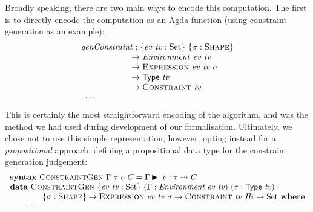 \documentclass[a4paper]{jfp}
\begin{document}
Broadly speaking, there are two main ways to encode this computation. The first is to directly encode the computation as an Agda function (using
constraint generation as an example):
\begin{displaymath}
   \begin{array}{l}
   \mathit{genConstraint} : \{\mathit{ev}\ \mathit{tv} : \text{Set}\}\ \{\sigma : \textsc{Shape}\} \\ \qquad\qquad\qquad 
                          \rightarrow \mathit{Environment}\ \mathit{ev}\ \mathit{tv} \\ \qquad\qquad\qquad  \rightarrow \textsc{Expression}\
                       \mathit{ev}\ \mathit{tv}\ \sigma  \\ \qquad\qquad\qquad
                          \rightarrow \textsf{Type}\ \mathit{tv} \\ \qquad\qquad\qquad \rightarrow \textsc{Constraint}\ \mathit{tv} \\
                       \begin{array}{c}
                          \cdots
                          \end{array}
  \end{array}
\end{displaymath}   
This is certainly the most straightforward encoding of the algorithm, and was the method we had used during development of our formalisation.
Ultimately, we chose not to use this simple representation, however, opting instead for a \emph{propositional} approach, defining a propositional data
type for the constraint generation judgement:
\begin{displaymath}
   \begin{array}{l}
    \textbf{syntax}\ \textsc{ConstraintGen}\ \Gamma\ \tau\ e\ C = \Gamma \vdasharrow e : \tau \leadsto C\\
    \textbf{data}\ \textsc{ConstraintGen}\ \{ \mathit{ev}\ \mathit{tv} : \text{Set}\} \ 
                       (\Gamma : \textit{Environment}\ \mathit{ev}\ \mathit{tv})\ (\tau : \textsf{Type}\ \mathit{tv}) : \\ \qquad\qquad \{\sigma : \textsc{Shape}\}
                    \rightarrow 
                    \textsc{Expression}\ \mathit{ev}\ \mathit{tv}\ \sigma \rightarrow \textsc{Constraint}\ \mathit{tv}\ \mathit{Hi} \rightarrow
              \text{Set}\ \textbf{where} \\ \qquad \cdots
  \end{array}
\end{displaymath}   
\end{document}
